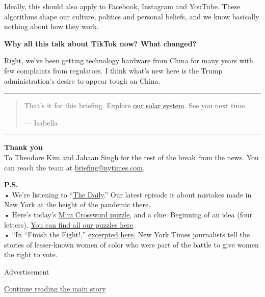 Ideally, this should also apply to Facebook, Instagram and YouTube.
These algorithms shape our culture, politics and personal beliefs, and
we know basically nothing about how they work.

\textbf{Why all this talk about TikTok now? What changed?}

Right, we've been getting technology hardware from China for many years
with few complaints from regulators. I think what's new here is the
Trump administration's desire to appear tough on China.

\begin{center}\rule{0.5\linewidth}{\linethickness}\end{center}

\begin{quote}
That's it for this briefing. Explore
\href{https://www.nytimes.com/interactive/2020/science/exploring-the-solar-system.html}{our
solar system}. See you next time.

--- Isabella
\end{quote}

\begin{center}\rule{0.5\linewidth}{\linethickness}\end{center}

\textbf{Thank you}\\
To Theodore Kim and Jahaan Singh for the rest of the break from the
news. You can reach the team at
\href{mailto:briefing+midnight@nytimes.com?subject=Briefing\%20Feedback}{briefing@nytimes.com}.

\textbf{P.S.}\\
• We're listening to ``\href{https://www.nytimes.com/thedaily}{The
Daily}.'' Our latest episode is about mistakes made in New York at the
height of the pandemic there.\\
• Here's today's
\href{https://www.nytimes.com/crosswords/game/mini}{Mini Crossword
puzzle}, and a clue: Beginning of an idea (four letters).
\href{https://www.nytimes.com/crosswords}{You can find all our puzzles
here}.\\
• ``In ``Finish the Fight!,''
\href{https://www.nytimes.com/2020/07/24/books/finish-the-fight-excerpt.html?smid=tw-nytbooks\&smtyp=cur}{excerpted
here}, New York Times journalists tell the stories of lesser-known women
of color who were part of the battle to give women the right to vote.

Advertisement

\protect\hyperlink{after-bottom}{Continue reading the main story}

